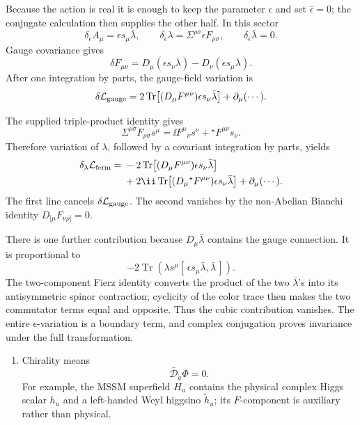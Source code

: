 \begin{enumerate}
Because the action is real it is enough to keep the parameter
  \(\epsilon\) and set \(\bar\epsilon=0\); the conjugate calculation then
  supplies the other half.  In this sector
  \[
    \delta_\epsilon A_\mu=\epsilon s_\mu\bar\lambda,
    \qquad
    \delta_\epsilon\lambda=\Sigma^{\rho\sigma}\epsilon F_{\rho\sigma},
    \qquad
    \delta_\epsilon\bar\lambda=0.
  \]
  Gauge covariance gives
  \[
    \delta F_{\mu\nu}
      =D_\mu(\epsilon s_\nu\bar\lambda)
       -D_\nu(\epsilon s_\mu\bar\lambda).
  \]
  After one integration by parts, the gauge-field variation is
  \[
    \delta\mathcal L_{\rm gauge}
      =2\operatorname{Tr}\!\left[
        (D_\mu F^{\mu\nu})\epsilon s_\nu\bar\lambda\right]
        +\partial_\mu(\cdots).
  \]

  The supplied triple-product identity gives
  \[
    \Sigma^{\rho\sigma}F_{\rho\sigma}s^\mu
      =\ii F^\mu{}_\nu s^\nu+{}^\star F^{\mu\nu}s_\nu .
  \]
  Therefore variation of \(\lambda\), followed by a covariant integration
  by parts, yields
  \[
  \begin{aligned}
    \delta_\lambda\mathcal L_{\rm ferm}
      ={}&-2\operatorname{Tr}\!\left[
        (D_\mu F^{\mu\nu})\epsilon s_\nu\bar\lambda\right]\\
       &+2\ii\operatorname{Tr}\!\left[
        (D_\mu{}^\star F^{\mu\nu})\epsilon s_\nu\bar\lambda\right]
        +\partial_\mu(\cdots).
  \end{aligned}
  \]
  The first line cancels \(\delta\mathcal L_{\rm gauge}\).  The second
  vanishes by the non-Abelian Bianchi identity
  \(D_{[\mu}F_{\nu\rho]}=0\).

  There is one further contribution because \(D_\mu\bar\lambda\) contains
  the gauge connection.  It is proportional to
  \[
    -2\operatorname{Tr}\!
      \left(\lambda s^\mu
        [\,\epsilon s_\mu\bar\lambda,\bar\lambda\,]\right).
  \]
  The two-component Fierz identity converts the product of the two
  \(\bar\lambda\)'s into its antisymmetric spinor contraction; cyclicity of
  the color trace then makes the two commutator terms equal and opposite.
  Thus the cubic contribution vanishes.  The entire
  \(\epsilon\)-variation is a boundary term, and complex conjugation proves
  invariance under the full transformation.

  \begin{enumerate}
    \item Chirality means
      \[
        \bar{\mathcal D}_{\dot a}\Phi=0.
      \]
      For example, the MSSM superfield \(H_u\) contains the physical complex
      Higgs scalar \(h_u\) and a left-handed Weyl higgsino
      \(\widetilde h_u\); its \(F\)-component is auxiliary rather than
      physical.


\end{enumerate}
\end{enumerate}
